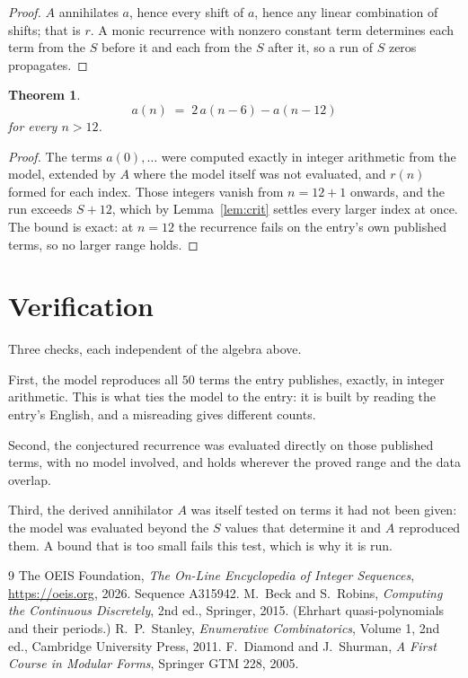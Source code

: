 \documentclass[11pt,a4paper]{article}
\theoremstyle{plain}
\newtheorem{theorem}{Theorem}
\theoremstyle{definition}
\begin{document}
\begin{proof}
$A$ annihilates $a$, hence every shift of $a$, hence any linear combination of shifts; that is
$r$. A monic recurrence with nonzero constant term determines each term from the $S$ before it
and each from the $S$ after it, so a run of $S$ zeros propagates.
\end{proof}

\begin{theorem}
\[
a(n)\;=\;2\,a(n-6) - a(n-12)
\]
for every $n>12$.
\end{theorem}

\begin{proof}
The terms $a(0),\dots$ were computed exactly in integer arithmetic from the model, extended by
$A$ where the model itself was not evaluated, and $r(n)$ formed for each index. Those integers
vanish from $n=12+1$ onwards, and the run exceeds $S+12$, which by
Lemma~\ref{lem:crit} settles every larger index at once. The bound is exact: at $n=12$ the recurrence fails on the entry's own published terms, so no larger range holds.
\end{proof}

\section{Verification}

Three checks, each independent of the algebra above.

First, the model reproduces all $50$ terms the entry publishes, exactly, in integer
arithmetic. This is what ties the model to the entry: it is built by reading the entry's
English, and a misreading gives different counts.

Second, the conjectured recurrence was evaluated directly on those published terms, with no
model involved, and holds wherever the proved range and the data overlap.

Third, the derived annihilator $A$ was itself tested on terms it had not been given: the model
was evaluated beyond the $S$ values that determine it and $A$ reproduced them. A bound that is
too small fails this test, which is why it is run.

\begin{thebibliography}{9}
 The OEIS Foundation, \emph{The On-Line Encyclopedia of Integer
Sequences}, \url{https://oeis.org}, 2026. Sequence A315942.
 M.~Beck and S.~Robins, \emph{Computing the Continuous Discretely},
2nd ed., Springer, 2015. (Ehrhart quasi-polynomials and their periods.)
 R.~P.~Stanley, \emph{Enumerative Combinatorics}, Volume 1, 2nd ed.,
Cambridge University Press, 2011.
 F.~Diamond and J.~Shurman, \emph{A First Course in Modular Forms},
Springer GTM 228, 2005.
\end{thebibliography}
\end{document}
